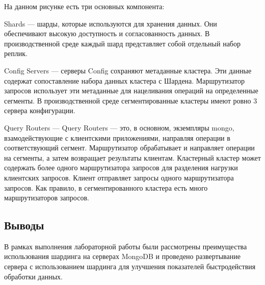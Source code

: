На данном рисунке есть три основных компонента:

Shards --- шарды, которые используются для хранения данных. Они обеспечивают высокую доступность и согласованность данных. В производственной среде каждый шард представляет собой отдельный набор реплик.

Config Servers --- серверы Config сохраняют метаданные кластера. Эти данные содержат сопоставление набора данных кластера с Шардена. Маршрутизатор запросов использует эти метаданные для нацеливания операций на определенные сегменты. В производственной среде сегментированные кластеры имеют ровно 3 сервера конфигурации.

Query Routers --- Query Routers --- это, в основном, экземпляры mongo, взамодействующие с клиентскими приложениями, направляя операции в соответствующий сегмент. Маршрутизатор обрабатывает и направляет операции на сегменты, а затем возвращает результаты клиентам. Кластерный кластер может содержать более одного маршрутизатора запросов для разделения нагрузки клиентских запросов. Клиент отправляет запросы одного маршрутизатора запросов. Как правило, в сегментированного кластера есть много маршрутизаторов запросов.

\subsection*{Выводы}
В рамках выполнения лабораторной работы были рассмотрены преимущества использования шардинга на серверах MongoDB и проведено развертывание сервера с использованием шардинга для улучшения показателей быстродействия обработки данных.


